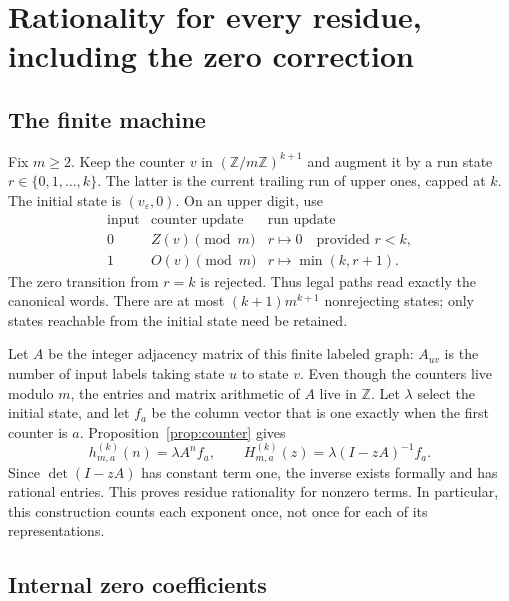 \documentclass[11pt,letterpaper]{article}
\numberwithin{equation}{section}
\theoremstyle{definition}
\theoremstyle{remark}
\newcommand{\Z}{\mathbb Z}
\newcommand{\eps}{\varepsilon}
\begin{document}
\section{Rationality for every residue, including the zero correction}
\label{sec:rational}

\subsection{The finite machine}

Fix $m\ge2$. Keep the counter $v$ in $(\Z/m\Z)^{k+1}$ and augment it by a
run state $r\in\{0,1,\ldots,k\}$. The latter is the current trailing run
of upper ones, capped at $k$. The initial state is $(v_\eps,0)$.
On an upper digit, use
\begin{equation}
\begin{array}{c|c|c}
\text{input}&\text{counter update}&\text{run update}\\ \hline
0&Z(v)\pmod m&r\mapsto0\quad\text{provided }r<k,\\
1&O(v)\pmod m&r\mapsto\min(k,r+1).
\end{array}
\label{eq:modmachine}
\end{equation}
The zero transition from $r=k$ is rejected. Thus legal paths read exactly
the canonical words. There are at most $(k+1)m^{k+1}$ nonrejecting states;
only states reachable from the initial state need be retained.

Let $A$ be the integer adjacency matrix of this finite labeled graph:
$A_{uv}$ is the number of input labels taking state $u$ to state $v$.
Even though the counters live modulo $m$, the entries and matrix arithmetic
of $A$ live in $\Z$. Let $\lambda$ select the initial state, and let $f_a$
be the column vector that is one exactly when the first counter is $a$.
Proposition~\ref{prop:counter} gives
\begin{equation}
 h_{m,a}^{(k)}(n)=\lambda A^nf_a,
 \qquad
 H_{m,a}^{(k)}(z)=\lambda(I-zA)^{-1}f_a.
 \label{eq:resolvent}
\end{equation}
Since $\det(I-zA)$ has constant term one, the inverse exists formally and
has rational entries. This proves residue rationality for nonzero terms.
In particular, this construction counts each exponent once, not once for
each of its representations.

\subsection{Internal zero coefficients}
\end{document}
